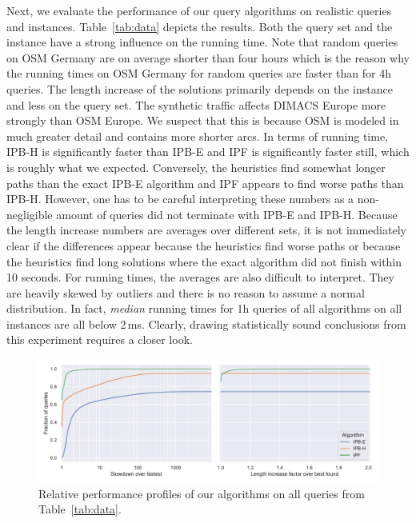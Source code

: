 \documentclass[a4paper,UKenglish,cleveref, autoref, thm-restate]{lipics-v2021}
\begin{document}
Next, we evaluate the performance of our query algorithms on realistic queries and instances.
Table~\ref{tab:data} depicts the results.
Both the query set and the instance have a strong influence on the running time.
Note that random queries on OSM Germany are on average shorter than four hours which is the reason why the running times on OSM Germany for random queries are faster than for 4h queries.
The length increase of the solutions primarily depends on the instance and less on the query set.
The synthetic traffic affects DIMACS Europe more strongly than OSM Europe.
We suspect that this is because OSM is modeled in much greater detail and contains more shorter arcs. %
In terms of running time, IPB-H is significantly faster than IPB-E and IPF is significantly faster still, which is roughly what we expected.
Conversely, the heuristics find somewhat longer paths than the exact IPB-E algorithm and IPF appears to find worse paths than IPB-H.
However, one has to be careful interpreting these numbers as a non-negligible amount of queries did not terminate with IPB-E and IPB-H.
Because the length increase numbers are averages over different sets, it is not immediately clear if the differences appear because the heuristics find worse paths or because the heuristics find long solutions where the exact algorithm did not finish within 10 seconds.
For running times, the averages are also difficult to interpret.
They are heavily skewed by outliers and there is no reason to assume a normal distribution.
In fact, \emph{median} running times for 1h queries of all algorithms on all instances are all below 2\,ms. %
Clearly, drawing statistically sound conclusions from this experiment requires a closer look.

\begin{figure}
\centering
\includegraphics[width=\linewidth]{fig/combined_perf_profile.pdf}
\caption{
Relative performance profiles of our algorithms on all queries from Table~\ref{tab:data}.
}\label{fig:perf_profile}
\end{figure}
\end{document}

